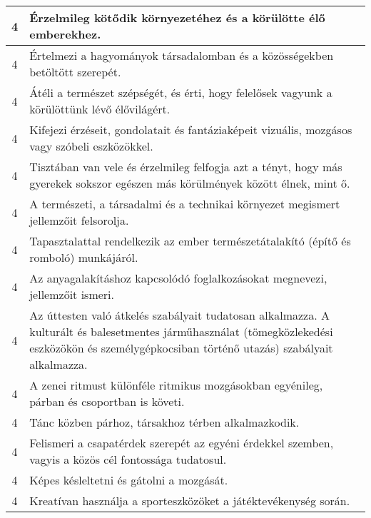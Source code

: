 \begin{longtable}{c | p{12cm} }
                                
                                          4 &  Érzelmileg kötődik környezetéhez és a körülötte élő emberekhez. \\ \hline
                                          4 &  Értelmezi a hagyományok társadalomban és a közösségekben betöltött szerepét. \\ \hline
                                          4 &  Átéli a természet szépségét, és érti, hogy felelősek vagyunk a körülöttünk lévő élővilágért. \\ \hline
                                          4 &  Kifejezi érzéseit, gondolatait és fantáziaképeit vizuális, mozgásos vagy szóbeli eszközökkel. \\ \hline
                                          4 &  Tisztában van vele és érzelmileg felfogja azt a tényt, hogy más gyerekek sokszor egészen más körülmények között élnek, mint ő. \\ \hline
                                          4 &  A természeti, a társadalmi és a technikai környezet megismert jellemzőit felsorolja. \\ \hline
                                          4 &  Tapasztalattal rendelkezik az ember természetátalakító (építő és romboló) munkájáról. \\ \hline
                                          4 &  Az anyagalakításhoz kapcsolódó foglalkozásokat megnevezi, jellemzőit ismeri. \\ \hline
                                          4 &  Az úttesten való átkelés szabályait tudatosan alkalmazza. A kulturált és balesetmentes járműhasználat (tömegközlekedési eszközökön és személygépkocsiban történő utazás) szabályait alkalmazza. \\ \hline
                                          4 &  A zenei ritmust különféle ritmikus mozgásokban egyénileg, párban és csoportban is követi. \\ \hline
                                          4 &  Tánc közben párhoz, társakhoz térben alkalmazkodik. \\ \hline
                                          4 &  Felismeri a csapatérdek szerepét az egyéni érdekkel szemben, vagyis a közös cél fontossága tudatosul. \\ \hline
                                          4 &  Képes késleltetni és gátolni a mozgását. \\ \hline
                                          4 &  Kreatívan használja a sporteszközöket a játéktevékenység során. \\ \hline
                                      
                        \end{longtable}
            \clearpage

